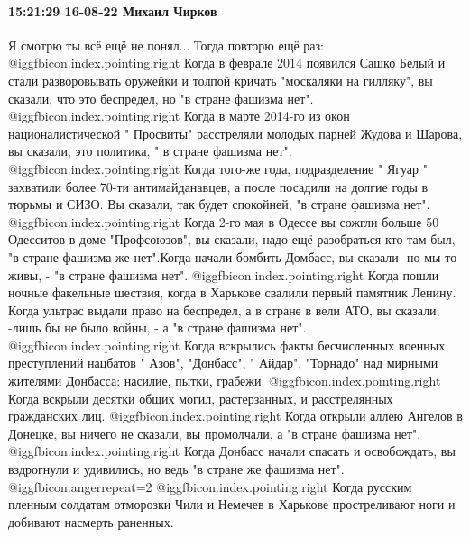  
 
 
 
 

\paragraph{15:21:29 16-08-22 Михаил Чирков}

Я смотрю ты всё ещё не понял...
Тогда повторю ещё раз:
 @igg{fbicon.index.pointing.right}  Когда в феврале 2014 появился Сашко Белый и стали разворовывать оружейки и толпой кричать "москаляки на гилляку", вы сказали, что это беспредел, но "в стране фашизма нет".
 @igg{fbicon.index.pointing.right} Когда в марте 2014-го из окон националистической " Просвиты" расстреляли молодых парней Жудова и Шарова, вы сказали, это политика, " в стране фашизма нет".
 @igg{fbicon.index.pointing.right} Когда того-же года, подразделение " Ягуар " захватили более 70-ти антимайданавцев, а после посадили на долгие годы в тюрьмы и СИЗО. Вы сказали, так будет спокойней, "в стране фашизма нет".
 @igg{fbicon.index.pointing.right} Когда 2-го мая в Одессе вы сожгли больше 50 Одесситов в доме "Профсоюзов", вы сказали, надо ещё разобраться кто там был, "в стране фашизма же нет".Когда начали бомбить Домбасс, вы сказали -но мы то живы, - "в стране фашизма нет".
 @igg{fbicon.index.pointing.right}  Когда пошли ночные факельные шествия, когда в Харькове свалили первый памятник Ленину. Когда ультрас выдали право на беспредел, а в стране в вели АТО, вы сказали, -лишь бы не было войны, - а "в стране фашизма нет".
 @igg{fbicon.index.pointing.right} Когда вскрылись факты бесчисленных военных преступлений нацбатов " Азов", "Донбасс", " Айдар", "Торнадо" над мирными жителями Донбасса: насилие, пытки, грабежи.  @igg{fbicon.index.pointing.right} Когда вскрыли десятки общих могил, растерзанных, и расстрелянных гражданских лиц.
 @igg{fbicon.index.pointing.right}  Когда открыли аллею Ангелов в Донецке, вы ничего не сказали, вы промолчали, а "в стране фашизма нет".
 @igg{fbicon.index.pointing.right} Когда Донбасс начали спасать и освобождать, вы вздрогнули и удивились, но ведь "в стране же фашизма нет".
 @igg{fbicon.anger}{repeat=2} 
 @igg{fbicon.index.pointing.right} Когда русским пленным солдатам отморозки Чили и Немечев в Харькове простреливают ноги и добивают насмерть раненных.
